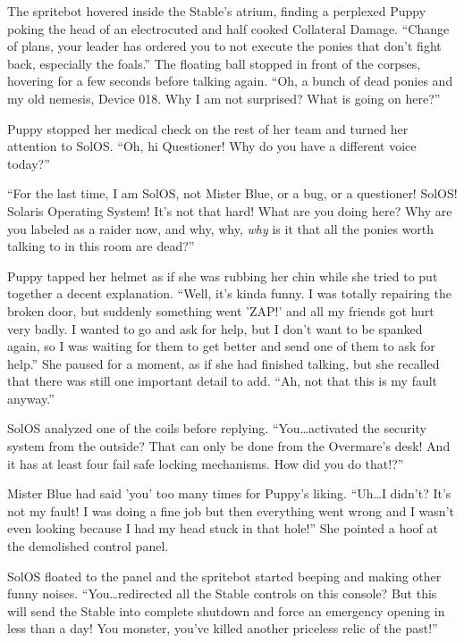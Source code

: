 \horizonline


The spritebot hovered inside the Stable's atrium, finding a perplexed Puppy poking the head of an electrocuted and half cooked Collateral Damage. ``Change of plans, your leader has ordered you to not execute the ponies that don't fight back, especially the foals.'' The floating ball stopped in front of the corpses, hovering for a few seconds before talking again. ``Oh, a bunch of dead ponies and my old nemesis, Device 018. Why I am not surprised? What is going on here?''

Puppy stopped her medical check on the rest of her team and turned her attention to SolOS. ``Oh, hi Questioner! Why do you have a different voice today?''

``For the last time, I am SolOS, not Mister Blue, or a bug, or a questioner! SolOS! Solaris Operating System! It's not that hard! What are you doing here? Why are you labeled as a raider now, and why, why, \emph{why}\/ is it that all the ponies worth talking to in this room are dead?''

Puppy tapped her helmet as if she was rubbing her chin while she tried to put together a decent explanation. ``Well, it's kinda funny. I was totally repairing the broken door, but suddenly something went 'ZAP!' and all my friends got hurt very badly. I wanted to go and ask for help, but I don't want to be spanked again, so I was waiting for them to get better and send one of them to ask for help.'' She paused for a moment, as if she had finished talking, but she recalled that there was still one important detail to add. ``Ah, not that this is my fault anyway.''

SolOS analyzed one of the coils before replying. ``You\dots activated the security system from the outside? That can only be done from the Overmare's desk! And it has at least four fail safe locking mechanisms. How did you do that!?''

Mister Blue had said 'you' too many times for Puppy's liking. ``Uh\dots I didn't? It's not my fault! I was doing a fine job but then everything went wrong and I wasn't even looking because I had my head stuck in that hole!'' She pointed a hoof at the demolished control panel.

SolOS floated to the panel and the spritebot started beeping and making other funny noises. ``You\dots redirected all the Stable controls on this console? But this will send the Stable into complete shutdown and force an emergency opening in less than a day! You monster, you've killed another priceless relic of the past!''

